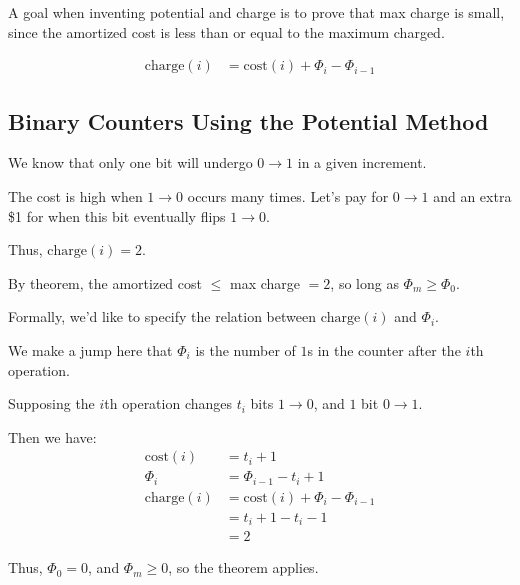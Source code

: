                     A goal when inventing potential and charge is to prove that max charge is small, since the amortized cost is less than or equal to the maximum charged.

                    \begin{align*}
                        \text{charge}(i) &= \text{cost}(i) + \Phi_i - \Phi_{i-1}
                    \end{align*}
                \subsection{Binary Counters Using the Potential Method} %
                \label{sub:binary_counters_using_the_potential_method}
                    We know that only one bit will undergo $0 \to 1$ in a given increment.

                    The cost is high when $1 \to 0$ occurs many times.
                    Let's pay for $0 \to 1$ and an extra \$1 for when this bit eventually flips $1 \to 0$.

                    Thus, $\text{charge}(i) = 2$.

                    By theorem, the amortized cost $\le$ max charge $=2$, so long as $\Phi_m \ge \Phi_0$.

                    Formally, we'd like to specify the relation between $\text{charge}(i)$ and $\Phi_i$.

                    We make a jump here that $\Phi_i$ is the number of $1$s in the counter after the $i$th operation.

                    Supposing the $i$th operation changes $t_i$ bits $1\to0$, and $1$ bit $0\to1$.

                    Then we have:
                    \begin{align*}
                        \text{cost}(i) &= t_i + 1 \\
                        \Phi_i &= \Phi_{i-1} - t_i + 1 \\
                        \text{charge}(i) &= \text{cost}(i) + \Phi_i - \Phi_{i-1} \\
                        &= t_i + 1 - t_i - 1 \\
                        &= 2
                    \end{align*}

                    Thus, $\Phi_0 = 0$, and $\Phi_m \ge 0$, so the theorem applies.
